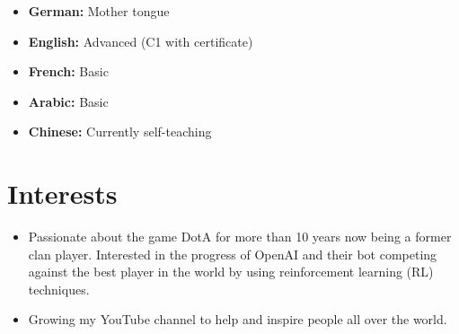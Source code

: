 \documentclass[11pt,a4paper,sans]{moderncv}        %
\begin{document}
\begin{itemize}

\setlength\itemsep{1em}

\item \textbf{German:} Mother tongue

\item \textbf{English:}  Advanced (C1 with certificate)

\item \textbf{French:}  Basic

\item \textbf{Arabic:}  Basic

\item \textbf{Chinese:}  Currently self-teaching


\end{itemize}

\section{Interests}

\vspace{6pt}

\begin{itemize}

\item{Passionate about the game DotA for more than 10 years now being a former clan player. Interested in the progress of OpenAI and their bot competing against the best player in the world by using reinforcement learning (RL) techniques.}

\vspace{6pt}

\item{Growing my YouTube channel to help and inspire people all over the world.}

\end{itemize}

\nocite{*}



\end{document}
